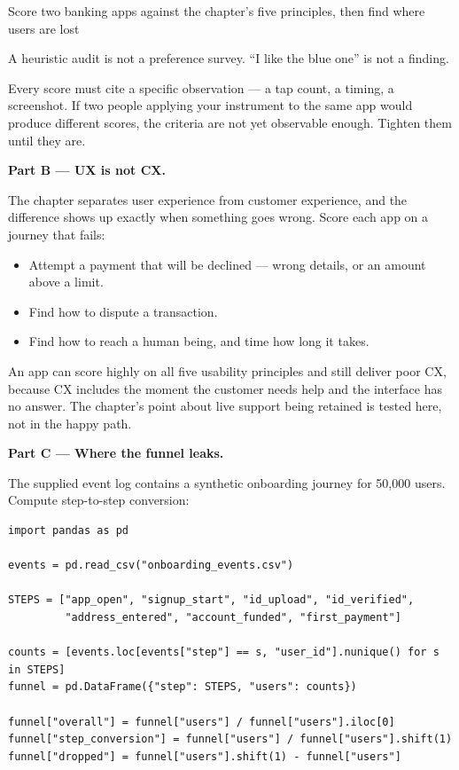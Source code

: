 \begin{labproject}{Score two banking apps against the chapter's five principles, then find where users are lost}
\begin{pitfall}
A heuristic audit is not a preference survey. ``I like the blue one'' is not a finding.

Every score must cite a specific observation --- a tap count, a timing, a screenshot. If two people applying your instrument to the same app would produce different scores, the criteria are not yet observable enough. Tighten them until they are.
\end{pitfall}

\medskip\noindent\textbf{Part B --- UX is not CX.}\par
The chapter separates user experience from customer experience, and the difference shows up exactly when something goes wrong. Score each app on a journey that fails:

\begin{itemize}
  \item Attempt a payment that will be declined --- wrong details, or an amount above a limit.
  \item Find how to dispute a transaction.
  \item Find how to reach a human being, and time how long it takes.
\end{itemize}

An app can score highly on all five usability principles and still deliver poor CX, because CX includes the moment the customer needs help and the interface has no answer. The chapter's point about live support being retained is tested here, not in the happy path.

\medskip\noindent\textbf{Part C --- Where the funnel leaks.}\par
The supplied event log contains a synthetic onboarding journey for 50{,}000 users. Compute step-to-step conversion:

\begin{lstlisting}[style=utppython]
import pandas as pd

events = pd.read_csv("onboarding_events.csv")

STEPS = ["app_open", "signup_start", "id_upload", "id_verified",
         "address_entered", "account_funded", "first_payment"]

counts = [events.loc[events["step"] == s, "user_id"].nunique() for s in STEPS]
funnel = pd.DataFrame({"step": STEPS, "users": counts})

funnel["overall"] = funnel["users"] / funnel["users"].iloc[0]
funnel["step_conversion"] = funnel["users"] / funnel["users"].shift(1)
funnel["dropped"] = funnel["users"].shift(1) - funnel["users"]


\end{lstlisting}
\end{labproject}
